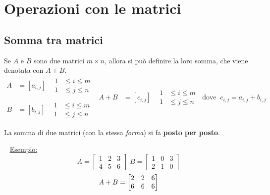 \documentclass[11pt,oneside]{book}
\begin{document}
\section{Operazioni con le matrici}
\subsection{Somma tra matrici}
Se $A$ e $B$ sono due matrici $m \times n$, allora si può definire la loro somma, che viene
denotata con $A+B$.
\begin{equation*}
    \begin{split}
        A & = [a_{i,j}] \;\;\; \begin{aligned} 1&\le i\le m\\ 1&\le j\le n \end{aligned} \\
        \\
        B & = [b_{i,j}] \;\;\; \begin{aligned} 1&\le i\le m\\ 1&\le j\le n \end{aligned}
    \end{split}
    \begin{split}
        A+B & = [c_{i,j}] \;\;\; \begin{aligned} 1&\le i\le m\\ 1&\le j\le n \end{aligned} \;\; \text{dove} \;\;
        c_{i,j} = a_{i,j} + b_{i,j}
    \end{split}
\end{equation*}

La somma di due matrici (con la stessa \emph{forma}) si fa \textbf{posto per posto}.

~\newline
\underline{Esempio:}
\begin{equation*}
    A=
    \begin{bmatrix}
        1 & 2 & 3 \\
        4 & 5 & 6
    \end{bmatrix} \;
    B=
    \begin{bmatrix}
        1 & 0 & 3 \\
        2 & 1 & 0
    \end{bmatrix}
\end{equation*}
\begin{equation*}
    \\ A+B=
    \begin{bmatrix}
        2 & 2 & 6 \\
        6 & 6 & 6
    \end{bmatrix}
\end{equation*}
\end{document}
